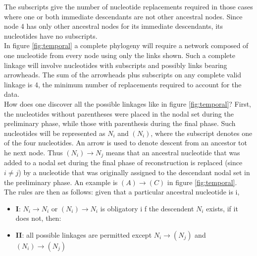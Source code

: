 The subscripts give the number of nucleotide replacements required in those cases where
one or both immediate descendants are not other ancestral nodes. Since node 4 has only other ancestral nodes for its immediate descendants, its nucleotides have no subscripts.
\\
In figure \ref{fig:temporal} a complete phylogeny will require a network composed of one nucleotide from every node using only the links shown. Such a complete linkage will involve nucleotides with subscripts and possibly links bearing arrowheads. The sum of the arrowheads plus subscripts on any complete valid linkage is 4, the minimum number of replacements required to account for the data.
\\
How does one discover all the possible linkages like in figure \ref{fig:temporal}?
First, the nucleotides without parentheses were placed in the nodal set during the preliminary phase, while those with parenthesis during the final phase. Such nucleotides will be represented as $N_i$ and $(N_i)$, where the subscript denotes one of the four nucleotides.
An arrow is used to denote descent from an ancestor tot he next node.  Thus $(N_i) \rightarrow N_j$ means that an ancestral nucleotide that was added to a nodal set during the final phase of reconstruction is replaced (since $i \neq j$) by a nucleotide that was originally assigned to the descendant nodal set in the preliminary phase. An example is $(A) \rightarrow (C)$ in figure \ref{fig:temporal}.
\\
The rules are then as follows: given that a particular ancestral nucleotide is i,
\begin{itemize}
\item \textbf{I}: $N_i \rightarrow N_i$ or $(N_i) \rightarrow N_i$ is obligatory i f the descendent $N_i$ exists, if it does not, then:
\item \textbf{II}: all possible linkages are permitted except $N_i \rightarrow (N_j)$ and $(N_i) \rightarrow (N_j)$
\end{itemize}

